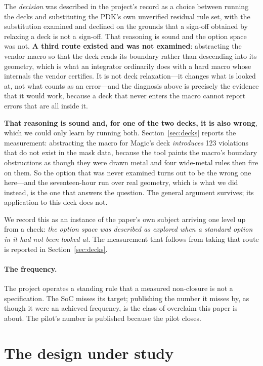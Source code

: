 \documentclass[11pt,a4paper]{article}
\begin{document}
The \emph{decision} was described in the project's record as a choice
between running the decks and substituting the PDK's own unverified
residual rule set, with the substitution examined and declined on the
grounds that a sign-off obtained by relaxing a deck is not a sign-off.
That reasoning is sound and the option space was not. \textbf{A third
route existed and was not examined}: abstracting the vendor macro so that
the deck reads its boundary rather than descending into its geometry,
which is what an integrator ordinarily does with a hard macro whose
internals the vendor certifies. It is not deck relaxation---it changes what is looked at, not what
counts as an error---and the diagnosis above is precisely the evidence
that it would work, because a deck that never enters the macro cannot
report errors that are all inside it.

\textbf{That reasoning is sound and, for one of the two decks, it is
also wrong}, which we could only learn by running both.
Section~\ref{sec:decks} reports the measurement: abstracting the macro
for Magic's deck \emph{introduces} 123 violations that do not exist in
the mask data, because the tool paints the macro's boundary obstructions
as though they were drawn metal and four wide-metal rules then fire on
them. So the option that was never examined turns out to be the wrong
one here---and the seventeen-hour run over real geometry, which is what
we did instead, is the one that answers the question. The general
argument survives; its application to this deck does not.

We record this as an instance of the paper's own subject arriving one
level up from a check: \emph{the option space was described as explored
when a standard option in it had not been looked at}. The measurement
that follows from taking that route is reported in
Section~\ref{sec:decks}.

\paragraph{The frequency.}
The project operates a standing rule that a measured non-closure is not a
specification. The SoC misses its target; publishing the number it misses
by, as though it were an achieved frequency, is the class of overclaim
this paper is about. The pilot's number is published because the pilot
closes.

\section{The design under study}
\label{sec:design}
\end{document}
